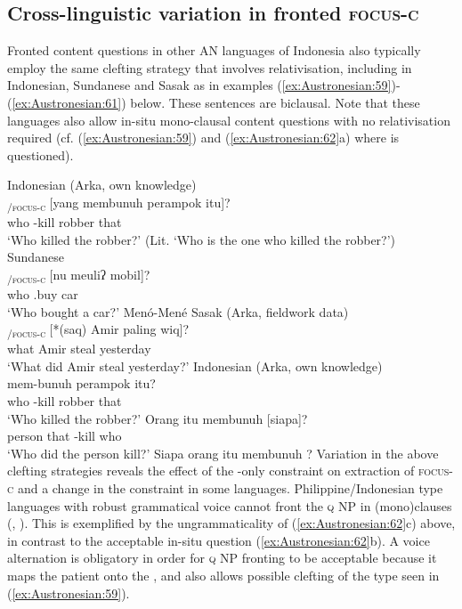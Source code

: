 \documentclass[output=paper,chinesefont]{../langscibook}
\begin{document}
\subsection{Cross-linguistic variation in fronted \textsc{focus-c}}
\label{sec:Austronesian:6.2}

Fronted content questions in other AN languages of Indonesia also typically employ the same clefting strategy that involves relativisation, including in Indonesian, Sundanese and Sasak as in examples (\ref{ex:Austronesian:59})-(\ref{ex:Austronesian:61}) below. These sentences are biclausal. Note that these languages also allow in-situ mono-clausal content questions with no relativisation required (cf. (\ref{ex:Austronesian:59}) and (\ref{ex:Austronesian:62}a) where \SUBJ is questioned).

\ea\label{ex:Austronesian:59} Indonesian  (Arka, own knowledge)\\
\gll
[Siapa]\textsubscript{\PRED/\textsc{focus-c}} [yang membunuh perampok itu]\textsubscript{\SUBJ}? \\
\phantom{[}who \phantom{[}{\REL} \AV-kill robber that\\
\glt`Who killed the robber?' (Lit. `Who is the one who killed the robber?')
\z
\ea\label{ex:Austronesian:60} Sundanese \citep[3]{Hanafi1997}\\
\gll
 [Sahaʔ]\textsubscript{\PRED/\textsc{focus-c}} [nu meuliʔ mobil]\textsubscript{\SUBJ}?\\
who \phantom{[}{\REL} \AV.buy car\\
\glt`Who bought a car?'
\z
\ea\label{ex:Austronesian:61} Menó-Mené Sasak (Arka, fieldwork data)\\
\gll
[Ape]\textsubscript{\PRED/\textsc{focus-c}} [*(saq) Amir paling wiq]\textsubscript{\SUBJ}?\\
\phantom{[}what  \phantom{[*}{\REL} Amir steal yesterday\\
\glt`What did Amir steal yesterday?'
\z
\ea\label{ex:Austronesian:62} Indonesian  (Arka, own knowledge)\\
\ea\gll
[Siapa]\textsubscript{\SUBJ} mem-bunuh perampok itu?\\
 who \AV-kill robber that\\
\glt`Who killed the robber?'
\ex\gll
Orang itu membunuh [siapa]\textsubscript{\OBJ}?\\
person that \AV-kill \phantom{[}who\\
\glt`Who did the person kill?'
\ex *Siapa orang itu membunuh  \GAP?
\z\z
Variation in the above clefting strategies reveals the effect of the \SUBJ-only constraint on extraction of \textsc{focus-c} and a change in the constraint in some languages. Philippine/Indonesian type languages with robust grammatical voice cannot front the \OBJ \textsc{q} NP in \AV (mono)clauses (\citealt[27]{arka2003}, \citealt[50,~208]{Kroeger93}).  This is exemplified by the ungrammaticality of (\ref{ex:Austronesian:62}c) above, in contrast to the acceptable in-situ question (\ref{ex:Austronesian:62}b). A voice alternation is obligatory in order for \OBJ \textsc{q} NP fronting to be acceptable because it maps the patient onto the \SUBJ, and also allows possible clefting of the type seen in (\ref{ex:Austronesian:59}).
\end{document}
